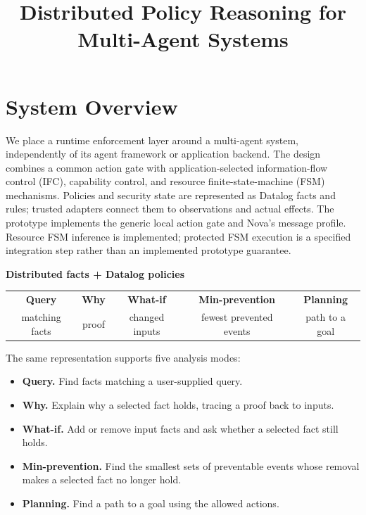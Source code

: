 \documentclass[10pt]{article}
\title{\vspace{-1.5em}Distributed Policy Reasoning for Multi-Agent Systems}
\date{}
\author{}
\begin{document}
\maketitle\vspace{-1.5em}

\section{System Overview}

We place a runtime enforcement layer around a multi-agent system, independently of
its agent framework or application backend. The design combines a common action gate
with application-selected information-flow control (IFC), capability control, and
resource finite-state-machine (FSM) mechanisms. Policies and security state are
represented as Datalog facts and rules; trusted adapters connect them to observations
and actual effects. The prototype implements the generic local action gate and Nova's
message profile. Resource FSM inference is implemented; protected FSM execution is a
specified integration step rather than an implemented prototype guarantee.

\begin{mainbox}
\centering
\textbf{Distributed facts + Datalog policies}\\[5pt]
\small
\begin{tabular}{ccccc}
\textbf{Query} & \textbf{Why} & \textbf{What-if} & \textbf{Min-prevention} & \textbf{Planning}\\
matching facts & proof & changed inputs & fewest prevented events & path to a goal
\end{tabular}
\end{mainbox}

The same representation supports five analysis modes:
\begin{itemize}
\item \textbf{Query.} Find facts matching a user-supplied query.
\item \textbf{Why.} Explain why a selected fact holds, tracing a proof back to inputs.
\item \textbf{What-if.} Add or remove input facts and ask whether a selected fact still holds.
\item \textbf{Min-prevention.} Find the smallest sets of preventable events whose removal makes a selected fact no longer hold.
\item \textbf{Planning.} Find a path to a goal using the allowed actions.
\end{itemize}
\end{document}
